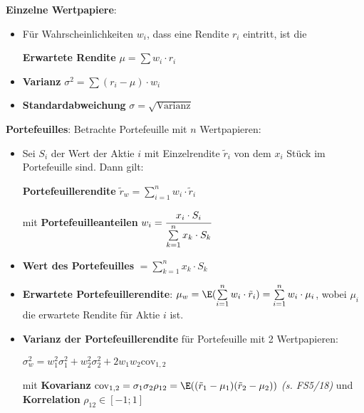 \textbf{Einzelne Wertpapiere}:
\begin{itemize}
	\item Für Wahrscheinlichkeiten $w_i$, dass eine Rendite $r_i$ eintritt, ist die
	\begin{center}
		\textbf{Erwartete Rendite} $\mu=\sum w_i\cdot r_i$
	\end{center}
	\item \textbf{Varianz} $\sigma^2=\sum (r_i-\mu)\cdot w_i$
	\item \textbf{Standardabweichung} $\sigma=\sqrt{\text{Varianz}}$
\end{itemize}
\bigskip
\textbf{Portefeuilles}: Betrachte Portefeuille mit $n$ Wertpapieren:
\begin{itemize}
	\item Sei $S_i$ der Wert der Aktie $i$ mit Einzelrendite $\tilde{r}_i$ von dem $x_i$ Stück im Portefeuille sind. Dann gilt:
	\begin{center}
		\textbf{Portefeuillerendite} $\tilde{r}_w=\sum\limits_{i=1}^n w_i\cdot\tilde{r}_i$
	\end{center}
	mit \textbf{Portefeuilleanteilen} $w_i=\cfrac{x_i\cdot S_i}{\sum\limits_{k=1}^{n}x_k\cdot S_k}$
	\item \textbf{Wert des Portefeuilles} $=\sum\limits_{k=1}^{n}x_k\cdot S_k$
	\item \textbf{Erwartete Portefeuillerendite}: $\mu_w=\E(\sum\limits_{i=1}^n w_i\cdot\tilde{r}_i)=\sum\limits_{i=1}^n w_i\cdot\mu_i$, wobei $\mu_i$ die erwartete Rendite für Aktie $i$ ist.
	\item \textbf{Varianz der Portefeuillerendite} für Portefeuille mit 2 Wertpapieren: 
	\begin{center}
		$\sigma^2_w=w_1^2\sigma_1^2+w_2^2\sigma_2^2+2w_1w_2\text{cov}_{1,2}$
	\end{center}
	mit \textbf{Kovarianz} $\text{cov}_{1,2}=\sigma_1\sigma_2\rho_{12}=\E((\tilde{r}_1-\mu_1)(\tilde{r}_2-\mu_2))$ \textit{(s. FS5/18)} und\\
	\textbf{Korrelation} $\rho_{12}\in[-1;1]$
\end{itemize}